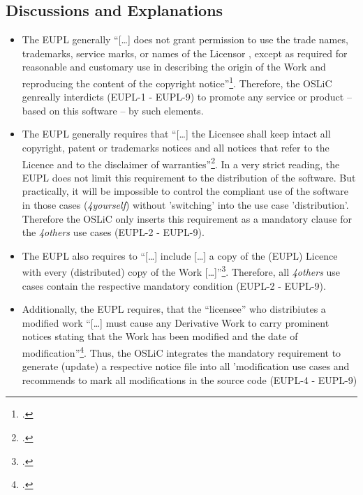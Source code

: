 \subsection{Discussions and Explanations}
\begin{itemize}
  
  \item The EUPL generally \enquote{[\ldots] does not grant permission to use
  the trade names, trademarks, service marks, or names of the Licensor , except
  as required for reasonable and customary use in describing the origin of the
  Work and reproducing the content of the copyright
  notice}\footcite[cf.][\nopage wp\ §5]{EuplLicense2007en}. Therefore, the OSLiC
  genreally interdicts (EUPL-1 - EUPL-9) to promote any service or product --
  based on this software -- by such elements.

  \item The EUPL generally requires that \enquote{[\ldots] the Licensee shall
  keep intact all copyright, patent or trademarks notices and all notices that
  refer to the Licence and to the disclaimer of
  warranties}\footcite[cf.][\nopage wp\ §5]{EuplLicense2007en}. In a very strict
  reading, the EUPL does not limit this requirement to the distribution of the
  software. But practically, it will be impossible to control the compliant use
  of the software in those cases (\emph{4yourself}) without 'switching' into the
  use case 'distribution'. Therefore the OSLiC only inserts this requirement as
  a mandatory clause for the \emph{4others} use cases (EUPL-2 - EUPL-9).
  
  \item The EUPL also requires to \enquote{[\ldots] include [\ldots] a copy of
  the (EUPL) Licence with every (distributed) copy of the Work
  [\ldots]}\footcite[cf.][\nopage wp\ §5]{EuplLicense2007en}. Therefore, all
  \emph{4others} use cases contain the respective mandatory condition (EUPL-2 -
  EUPL-9).
  
  \item Additionally, the EUPL requires, that the \enquote{licensee} who
  distribiutes a modified work \enquote{[\ldots] must cause any Derivative Work
  to carry prominent notices stating that the Work has been modified and the
  date of modification}\footcite[cf.][\nopage wp\ §5]{EuplLicense2007en}. Thus,
  the OSLiC integrates the mandatory requirement to generate (update) a
  respective notice file into all 'modification use cases and recommends to mark
  all modifications in the source code (EUPL-4 - EUPL-9)
  

\end{itemize}
